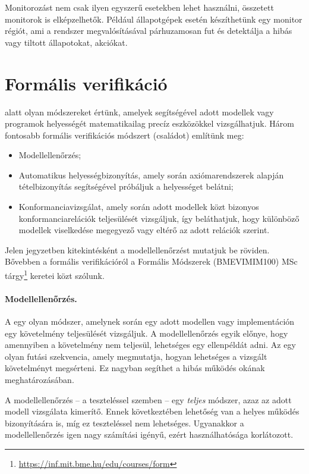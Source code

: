 Monitorozást nem csak ilyen egyszerű esetekben lehet használni, összetett monitorok is elképzelhetők. Például állapotgépek esetén készíthetünk egy monitor régiót, ami a rendszer megvalósításával párhuzamosan fut és detektálja a hibás vagy tiltott állapotokat, akciókat.







\section{Formális verifikáció\kiegeszitoanyag}\label{sec:formalis-verifikacio}
 alatt olyan módszereket értünk, amelyek segítségével adott modellek vagy programok helyességét matematikailag precíz eszközökkel vizsgálhatjuk. Három fontosabb formális verifikációs módszert (családot) említünk meg:
\begin{itemize}
\item Modellellenőrzés;
\item Automatikus helyességbizonyítás, amely során axiómarendszerek alapján tételbizonyítás segítségével próbáljuk a helyességet belátni;
\item Konformanciavizsgálat, amely során adott modellek közt bizonyos konformanciarelációk teljesülését vizsgáljuk, így beláthatjuk, hogy különböző modellek viselkedése megegyező vagy eltérő az adott relációk szerint.
\end{itemize}

Jelen jegyzetben kitekintésként a modellellenőrzést mutatjuk be röviden. Bővebben a formális verifikációról a Formális Módszerek (BMEVIMIM100) MSc tárgy\footnote{\url{https://inf.mit.bme.hu/edu/courses/form}} keretei közt szólunk.

\paragraph{Modellellenőrzés.}
A  egy olyan módszer, amelynek során egy adott modellen vagy implementáción egy követelmény teljesülését vizsgáljuk. A modellellenőrzés egyik előnye, hogy amennyiben a követelmény nem teljesül, lehetséges egy ellenpéldát adni. Az  egy olyan futási szekvencia, amely megmutatja, hogyan lehetséges a vizsgált követelményt megsérteni. Ez nagyban segíthet a hibás működés okának meghatározásában.

A modellellenőrzés -- a teszteléssel szemben -- egy \emph{teljes} módszer, azaz az adott modell vizsgálata kimerítő. Ennek következtében lehetőség van a helyes működés bizonyítására is, míg ez teszteléssel nem lehetséges. Ugyanakkor a modellellenőrzés igen nagy számítási igényű, ezért használhatósága korlátozott.



